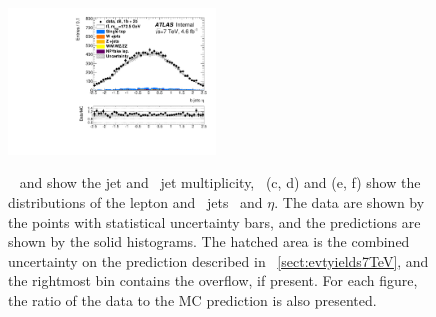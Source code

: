 \begin{figure}[tbp!]
{  \includegraphics[width=0.49\textwidth]{./figs/Plot_3dTMT_dataMC_BjetEta_s1725_seltype5.pdf}
  \label{sfig:lltaggedjetseta}
}
\hfill
\caption[Data to \gls{MC} comparison for $\sqrts=7$~\TeV\ data: direct observables]{
~ and  show the jet and \btagged\ jet multiplicity, ~(c, d) and (e, f) show the distributions of the lepton and \btagged\ jets \pt\ and $\eta$. 
%
The data are shown by the points with statistical uncertainty bars, and the predictions are shown by the solid histograms. 
%
The hatched area is the combined uncertainty on the prediction described in \sect~\ref{sect:evtyields7TeV}, and the rightmost bin contains the overflow, if present. 
%
For each figure, the ratio of the data to the \gls{MC} prediction is also presented.
%
  \label{fig:DLdataMCcomp7TeV}}
\end{figure}
%

